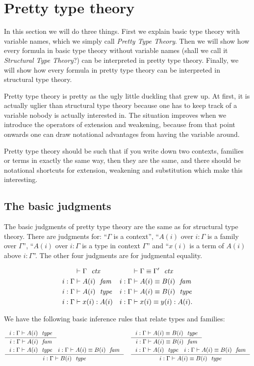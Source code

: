 \section{Pretty type theory}
In this section we will do three things. First we explain basic type theory with
variable names, which we simply call \emph{Pretty Type Theory}. 
Then we will show how every formula in basic type theory without
variable names (shall we call it \emph{Structural Type Theory}?) 
can be interpreted in pretty type theory. Finally, we will show how every formula
in pretty type theory can be interpreted in structural type theory.

Pretty type theory is pretty as the ugly little duckling that grew up. At first, it is actually uglier than
structural type theory because one has to keep track of a variable nobody is
actually interested in. The situation improves when we introduce the operators
of extension and weakening, because from that point onwards one can draw notational
advantages from having the variable around.

Pretty type theory should be such that if you write down two contexts, families
or terms in exactly the same way, then they are the same, and there should be
notational shortcuts for extension, weakening and substitution which make
this interesting.

\subsection{The basic judgments}
The basic judgments of pretty type theory are the same as for structural type
theory. There are judgments for: ``$\Gamma$ is a context'',
``$A(i)$ over $i:\Gamma$ is a family over $\Gamma$'', ``$A(i)$ over $i:\Gamma$ 
is a type in context $\Gamma$''
and ``$x(i)$ is a term of $A(i)$ above $i:\Gamma$''. The other four
judgments are for judgmental equality. 

\begin{align*}
\jvctx*{\Gamma} & \jvctxeq*{\Gamma}{\Gamma'}\\
\jvfam*{i}{\Gamma}{A} & \jvfameq*{i}{\Gamma}{A}{B}\\
\jvtype*{i}{\Gamma}{A} & \jvtypeeq*{i}{\Gamma}{A}{B}\\
\jvterm*{i}{\Gamma}{A}{x} & \jvtermeq*{i}{\Gamma}{A}{x}{y}.
\end{align*}

We have the following basic inference rules that relate types and families:

\begin{small}
\begin{align*}
& \inference{\jvtype{i}{\Gamma}{A}}{\jvfam{i}{\Gamma}{A}} & & \inference{\jvtypeeq{i}{\Gamma}{A}{B}}{\jvfameq{i}{\Gamma}{A}{B}}\\
& \inference{\jvtype{i}{\Gamma}{A}\quad\jvfameq{i}{\Gamma}{A}{B}}{\jvtype{i}{\Gamma}{B}}
& & \inference{\jvtype{i}{\Gamma}{A}\quad\jvfameq{i}{\Gamma}{A}{B}}{\jvtypeeq{i}{\Gamma}{A}{B}}
\end{align*}
\end{small}

